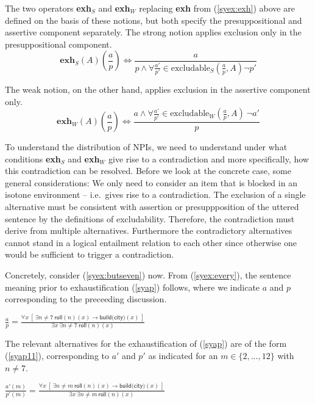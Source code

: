 \documentclass[output=paper]{langscibook}
\begin{document}
The two operators \textbf{exh}$_{S}$ and \textbf{exh}$_{W}$ replacing \textbf{exh} from (\ref{syex:exh}) above are defined on the basis of these notions, but both specify the presuppositional and assertive component separately. The strong notion applies exclusion only in the presuppositional component.
\begin{equation*}
\textbf{exh}_S(A)\left(\frac{a}{p}\right) \Leftrightarrow \frac{a}{p \land \forall \frac{a'}{p'} \in \text{excludable}_S\left(\frac{a}{p},A\right) \neg p'}
\end{equation*}

The weak notion, on the other hand, applies exclusion in the assertive component only.  
\begin{equation*}
\textbf{exh}_W(A)\left(\frac{a}{p}\right) \Leftrightarrow \frac{a \land \forall \frac{a'}{p'}  \in \text{excludable}_W\left(\frac{a}{p},A\right) \ \neg a'}{p}
\end{equation*}

To understand the distribution of NPIs, we need to understand under what conditions  \textbf{exh}$_S$ and \textbf{exh}$_W$ give rise to a contradiction and more specifically, how this contradiction can be resolved.  Before we look at the concrete case, some general considerations: We only need to consider an item that is blocked  in an isotone environment -- i.e.\ gives rise to a contradiction.
The exclusion of a single alternative must be consistent with assertion or presuppposition of the uttered sentence by the definitions of excludability.  Therefore, the contradiction must derive from multiple alternatives.  Furthermore the contradictory alternatives cannot stand in a logical entailment relation to each other since otherwise one would be sufficient to trigger a contradiction.

Concretely, consider (\ref{syex:butseven}) now.  From (\ref{syex:every}), the sentence meaning prior to exhaustification (\ref{syap}) follows, where we indicate $a$ and $p$ corresponding to the preceeding discussion. 

\ea \label{syap}$\displaystyle \frac{a}{p} = 
\frac{\forall x\ [\ \exists n \neq 7\  \textsf{roll}(n)(x)  \rightarrow \textsf{build(city)}(x)\ ]}{\exists x\  \exists n \neq 7\  \textsf{roll}(n)(x)}$
\z

The relevant  alternatives for the exhaustification of (\ref{syap}) are of the form (\ref{syap11}), corresponding to $a'$ and $p'$ as indicated for an $m \in \{2, \dots, 12\}$ with $n \neq 7$.

\ea \label{syap11}$\displaystyle \frac{a'(m)}{p'(m)} = 
\frac{\forall x\ [\ \exists n \neq m\  \textsf{roll}(n)(x)  \rightarrow \textsf{build(city)}(x)\ ]}{\exists x\  \exists n \neq m\  \textsf{roll}(n)(x)}$
\z
\end{document}
